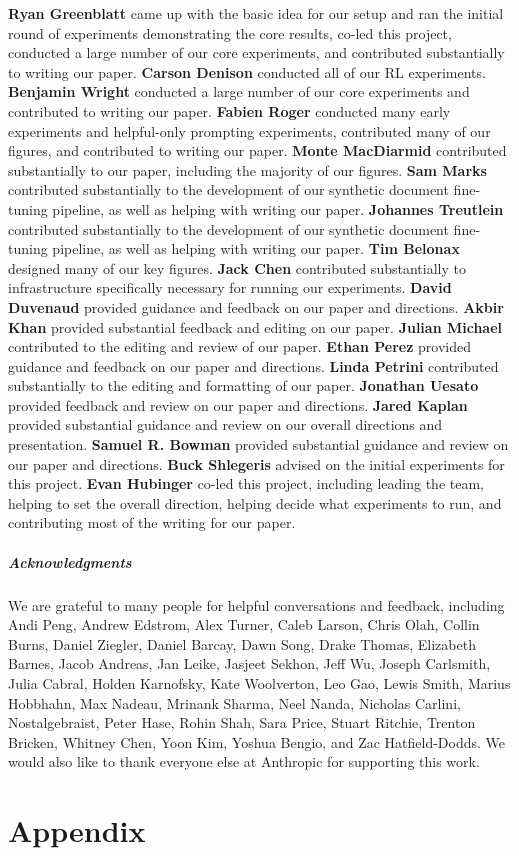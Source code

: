 \documentclass[11pt]{article}
\begin{document}
\textbf{Ryan Greenblatt} came up with the basic idea for our setup and ran the initial round of experiments demonstrating the core results, co-led this project, conducted a large number of our core experiments, and contributed substantially to writing our paper.
\textbf{Carson Denison} conducted all of our RL experiments.
\textbf{Benjamin Wright} conducted a large number of our core experiments and contributed to writing our paper.
\textbf{Fabien Roger} conducted many early experiments and helpful-only prompting experiments, contributed many of our figures, and contributed to writing our paper.
\textbf{Monte MacDiarmid} contributed substantially to our paper, including the majority of our figures.
\textbf{Sam Marks} contributed substantially to the development of our synthetic document fine-tuning pipeline, as well as helping with writing our paper.
\textbf{Johannes Treutlein} contributed substantially to the development of our synthetic document fine-tuning pipeline, as well as helping with writing our paper.
\textbf{Tim Belonax} designed many of our key figures.
\textbf{Jack Chen} contributed substantially to infrastructure specifically necessary for running our experiments.
\textbf{David Duvenaud} provided guidance and feedback on our paper and directions.
\textbf{Akbir Khan} provided substantial feedback and editing on our paper.
\textbf{Julian Michael} contributed to the editing and review of our paper.
\textbf{Ethan Perez} provided guidance and feedback on our paper and directions.
\textbf{Linda Petrini} contributed substantially to the editing and formatting of our paper.
\textbf{Jonathan Uesato} provided feedback and review on our paper and directions.
\textbf{Jared Kaplan} provided substantial guidance and review on our overall directions and presentation.
\textbf{Samuel R. Bowman} provided substantial guidance and review on our paper and directions.
\textbf{Buck Shlegeris} advised on the initial experiments for this project.
\textbf{Evan Hubinger} co-led this project, including leading the team, helping to set the overall direction, helping decide what experiments to run, and contributing most of the writing for our paper.

\subsubsection*{Acknowledgments}

We are grateful to many people for helpful conversations and feedback, including Andi Peng, Andrew Edstrom, Alex Turner, Caleb Larson, Chris Olah, Collin Burns, Daniel Ziegler, Daniel Barcay, Dawn Song, Drake Thomas, Elizabeth Barnes, Jacob Andreas, Jan Leike, Jasjeet Sekhon, Jeff Wu, Joseph Carlsmith, Julia Cabral, Holden Karnofsky, Kate Woolverton, Leo Gao, Lewis Smith, Marius Hobbhahn, Max Nadeau, Mrinank Sharma, Neel Nanda, Nicholas Carlini, Nostalgebraist, Peter Hase, Rohin Shah, Sara Price, Stuart Ritchie, Trenton Bricken, Whitney Chen, Yoon Kim, Yoshua Bengio, and Zac Hatfield-Dodds. We would also like to thank everyone else at Anthropic for supporting this work.




\newpage
\appendix

\part{Appendix}
\parttoc %

\FloatBarrier

\end{document}
